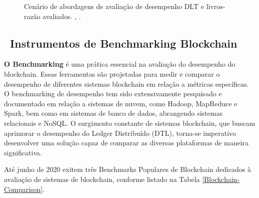         \begin{figure}[H]
            \centering
            \caption{Cenário de abordagens de avaliação de desempenho DLT e livros-razão avaliados. \cite{9129732}, .}
            \label{Blockchain-Evaluation}
        \end{figure}

    
    \subsection{\ Instrumentos de Benchmarking Blockchain}

     \textbf{O Benchmarking} é uma prática essencial na avaliação do desempenho do blockchain. Essas ferramentas são projetadas para medir e comparar o desempenho de diferentes sistemas blockchain em relação a métricas específicas.
     O benchmarking de desempenho tem sido extensivamente pesquisado e documentado em relação a sistemas de nuvem, como Hadoop, MapReduce e Spark, bem como em sistemas de banco de dados, abrangendo sistemas relacionais e NoSQL.\cite{9129732}
     O surgimento constante de sistemas blockchain, que buscam aprimorar o desempenho do Ledger Distribuído (DTL), torna-se imperativo desenvolver uma solução capaz de comparar as diversas plataformas de maneira significativa.

     Até junho de 2020  exitem três Benchmarks Populares de Blockchain dedicados à avaliação de sistemas de blockchain, conforme listado na Tabela  \ref{Blockchain-Comparison}.


